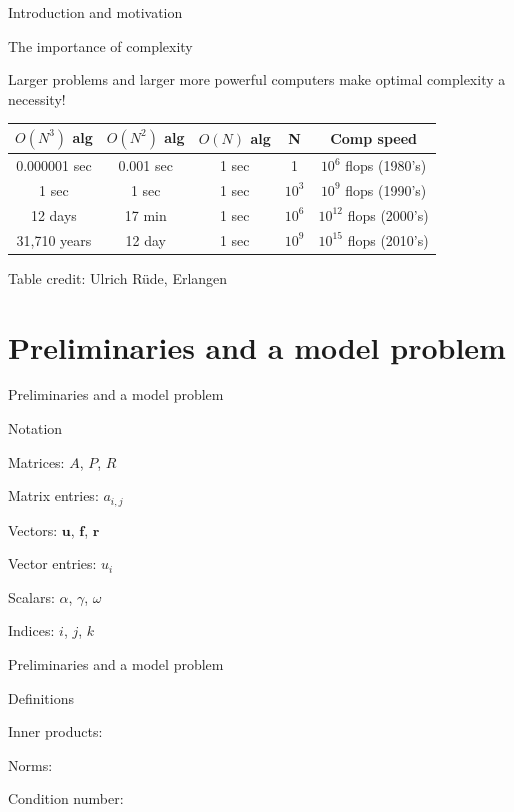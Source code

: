 \documentclass[18pt,xcolor=table]{beamer}
\begin{document}
\begin{frame}{Introduction and motivation}
\begin{block}{The importance of complexity}
\bit
\item Larger problems and larger more powerful computers make optimal complexity a necessity!
\eit
\begin{table}
\begin{tabular}{c | c | c | c | c}
$O(N^3)$ alg & $O(N^2)$ alg & $O(N)$ alg & N & Comp speed \\
\hline
0.000001 sec &  0.001 sec & 1 sec & 1 & $10^6$ flops (1980's) \\
1 sec &  1 sec & 1 sec & $10^3$ & $10^9$ flops (1990's) \\
12 days &  17 min & 1 sec & $10^6$ & $10^{12}$ flops (2000's) \\
31,710 years &  12 day & 1 sec & $10^9$ & $10^{15}$ flops (2010's)
\end{tabular}
\end{table}
\end{block}
\tiny{Table credit: Ulrich R\"ude, Erlangen}
\end{frame}



\section{Preliminaries and a model problem}

\begin{frame}{Preliminaries and a model problem}
\begin{block}{Notation}
\bit
\item Matrices: $A$, $P$, $R$
\item Matrix entries: $a_{i,j}$
\item Vectors: $\mathbf{u}$, $\mathbf{f}$, $\mathbf{r}$
\item Vector entries: $u_i$
\item Scalars: $\alpha$, $\gamma$, $\omega$
\item Indices: $i$, $j$, $k$
\eit
\end{block}
\end{frame}

\begin{frame}{Preliminaries and a model problem}
\begin{block}{Definitions}
\bit
\item Inner products: 
\item Norms: 
\item Condition number:
\eit
\end{block}
\end{frame}
\end{document}
